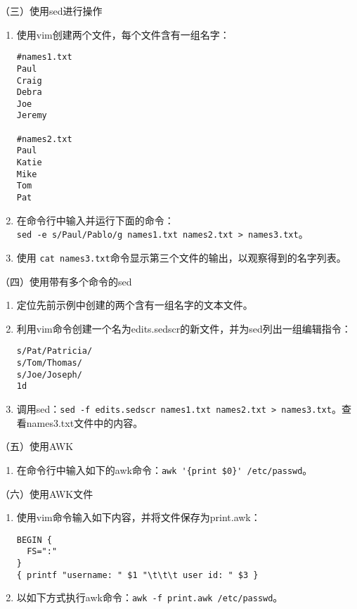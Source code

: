 \vspace{0.1in}
（三）使用sed进行操作
\begin{enumerate}
  \item 使用vim创建两个文件，每个文件含有一组名字：
\begin{verbatim}
#names1.txt
Paul
Craig
Debra
Joe
Jeremy

#names2.txt
Paul
Katie
Mike
Tom
Pat
\end{verbatim}
  \item 在命令行中输入并运行下面的命令：\\ \verb|sed -e s/Paul/Pablo/g names1.txt names2.txt > names3.txt|。
  \item 使用 \verb|cat names3.txt|命令显示第三个文件的输出，以观察得到的名字列表。
\end{enumerate}

\vspace{0.1in}
（四）使用带有多个命令的sed
\begin{enumerate}
  \item 定位先前示例中创建的两个含有一组名字的文本文件。
  \item 利用vim命令创建一个名为edits.sedscr的新文件，并为sed列出一组编辑指令：
\begin{verbatim}
s/Pat/Patricia/
s/Tom/Thomas/
s/Joe/Joseph/
1d
\end{verbatim}
  \item 调用sed：\verb|sed -f edits.sedscr names1.txt names2.txt > names3.txt|。查看names3.txt文件中的内容。
\end{enumerate}

\vspace{0.1in}
（五）使用AWK
\begin{enumerate}
  \item 在命令行中输入如下的awk命令：\verb|awk '{print $0}' /etc/passwd|。
\end{enumerate}

\vspace{0.1in}
（六）使用AWK文件
\begin{enumerate}
  \item 使用vim命令输入如下内容，并将文件保存为print.awk：
\begin{verbatim}
BEGIN {
  FS=":"
}
{ printf "username: " $1 "\t\t\t user id: " $3 }
\end{verbatim}
  \item 以如下方式执行awk命令：\verb|awk -f print.awk /etc/passwd|。
\end{enumerate}


